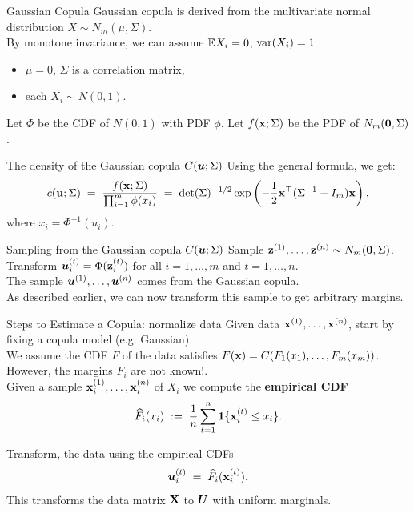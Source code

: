 \documentclass[11pt,handout,aspectratio=169]{beamer}
\begin{document}
\begin{frame}{Gaussian Copula}
Gaussian copula is derived from the multivariate normal distribution $X\sim N_m(\mu,\Sigma)$.\\[3mm]
By monotone invariance, we can assume $\mathbb E X_i=0$, $\mathrm{var}(X_i)=1$
\begin{itemize}
	\item  $\mu=0$, $\Sigma$ is a correlation matrix,
	\item each $X_i\sim N(0,1)$. 
\end{itemize}
 

Let $\Phi$ be the CDF of $N(0,1)$ with PDF $\phi$. Let $f(\mathbf{x};\Sigma)$ be the PDF of $N_m(\boldsymbol 0,\Sigma)$.
\begin{alertblock}{The density of the Gaussian copula $C(\boldsymbol u;\Sigma)$}
	Using the general formula, we get:
	\[ c(\mathbf{u}; \Sigma) \;=\; \frac{f(\mathbf{x};\Sigma)}{\prod_{i=1}^m \phi(x_i)}\;=\; \det(\Sigma)^{-1/2} \exp\left(-\frac{1}{2} \mathbf{x}^\top (\Sigma^{-1} - I_m) \mathbf{x}\right), \]
	where $x_i=\Phi^{-1}(u_i)$.
\end{alertblock}
 \end{frame}

\begin{frame}{Sampling from the Gaussian copula $C(\boldsymbol u;\Sigma)$}
	Sample $\mathbf{z}^{(1)},\ldots,\mathbf{z}^{(n)}\sim N_m(\boldsymbol 0,\Sigma)$.\\[3mm]
	
	Transform $\boldsymbol u^{(t)}_i=\Phi(\mathbf{z}^{(t)}_i)$ for all $i=1,\ldots,m$ and $t=1,\ldots,n$. \\[3mm]
	
	The sample $\boldsymbol u^{(1)},\ldots,\boldsymbol u^{(n)}$ comes from the Gaussian copula. \\[3mm]
	
	As described earlier, we can now transform this sample to get arbitrary margins.
\end{frame}

\begin{frame}{Steps to Estimate a Copula: normalize data}
	Given data $\mathbf{x}^{(1)},\ldots,\mathbf{x}^{(n)}$, start by fixing a copula model (e.g. Gaussian).\\[3mm]
	
	We assume the CDF $F$ of the data satisfies $F(\mathbf{x})=C(F_1(x_1),\ldots,F_m(x_m))$.\\[3mm]
	
	However, \alert{the margins $F_i$ are not known!}.\\[3mm]
	
	Given a sample $\mathbf{x}_i^{(1)},\ldots,\mathbf{x}_i^{(n)}$ of $X_i$ we compute the \textbf{empirical CDF}
	$$
	\widehat F_i(x_i)\;:=\;\frac1n \sum_{t=1}^n \boldsymbol 1\{\mathbf{x}_i^{(t)}\leq x_i\}.
	$$
\begin{alertblock}{}
	Transform, the data using the empirical CDFs
$$
\boldsymbol u^{(t)}_i\;=\;\widehat F_i(\mathbf{x}^{(t)}_i).
$$
This transforms the data matrix $\mathbf{X}$ to $\boldsymbol U$ with uniform marginals. 
\end{alertblock}\end{frame}
\end{document}
